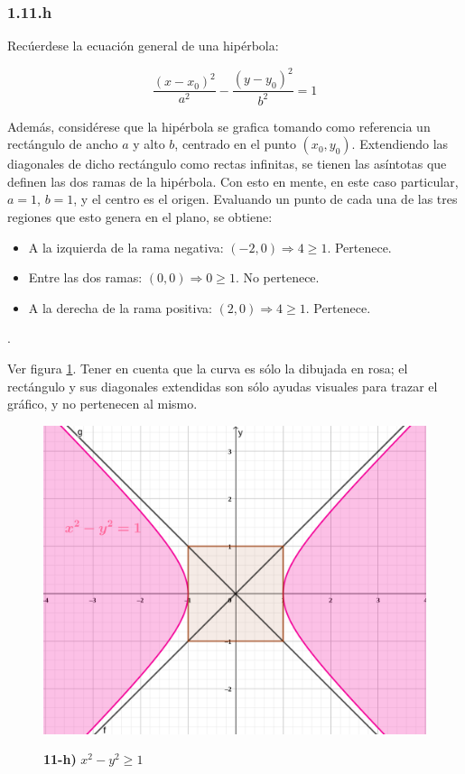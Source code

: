 \documentclass{article}
\begin{document}
\subsubsection*{1.11.h}
\label{subsubsec:1.11.h}

Recúerdese la ecuación general de una hipérbola:

\begin{equation}
\frac{(x-x_0)^2}{a^2} - \frac{(y-y_0)^2}{b^2} = 1
\end{equation}

Además, considérese que la hipérbola se grafica tomando como referencia un rectángulo de ancho $a$ y alto $b$, centrado en el punto $(x_0, y_0)$. Extendiendo las diagonales de dicho rectángulo como rectas infinitas, se tienen las asíntotas que definen las dos ramas de la hipérbola. Con esto en mente, en este caso particular, $a=1$, $b=1$, y el centro es el origen. Evaluando un punto de cada una de las tres regiones que esto genera en el plano, se obtiene:

\begin{itemize}
\item A la izquierda de la rama negativa: $(-2, 0) \Rightarrow 4 \geq 1$. Pertenece.
\item Entre las dos ramas: $(0, 0) \Rightarrow 0 \geq 1$. No pertenece.
\item A la derecha de la rama positiva: $(2, 0) \Rightarrow 4 \geq 1$. Pertenece.
\end{itemize}.

Ver figura \ref{fig:1-11-h}. Tener en cuenta que la curva es sólo la dibujada en rosa; el rectángulo y sus diagonales extendidas son sólo ayudas visuales para trazar el gráfico, y no pertenecen al mismo.

\begin{figure}[ht]
\caption{\textbf{11-h)} $x^2 - y^2 \geq 1$}
\includegraphics[scale=0.75]{img/ejercicios/1/11-h.png} 
\centering
\label{fig:1-11-h}
\end{figure}
\end{document}

